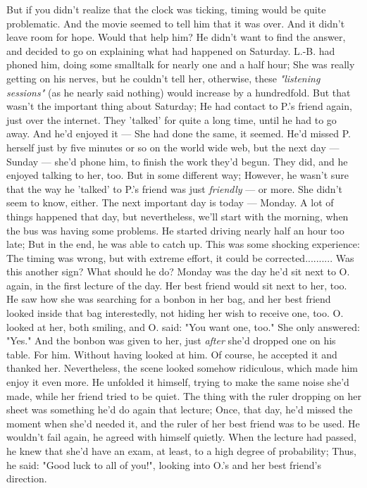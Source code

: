 But if you didn't realize that the clock was ticking, timing would be quite problematic. And the movie seemed to tell him that it was over. 
And it didn't leave room for hope. 
Would that help him?
He didn't want to find the answer, and decided to go on explaining what had happened on Saturday. L.-B. had phoned him, doing some smalltalk for nearly one and a half hour; She was really getting on his nerves, but he couldn't tell her, otherwise, these \emph{"listening sessions"} (as he nearly said nothing) would increase by a hundredfold. 
But that wasn't the important thing about Saturday; He had contact to P.'s friend again, just over the internet. They 'talked' for quite a long time, until he had to go away. And he'd enjoyed it --- She had done the same, it seemed. 
He'd missed P. herself just by five minutes or so on the world wide web, but the next day --- Sunday --- she'd phone him, to finish the work they'd begun. 
They did, and he enjoyed talking to her, too. But in some different way; However, he wasn't sure that the way he 'talked' to P.'s friend was just \emph{friendly} --- or more. She didn't seem to know, either. 
The next important day is today --- Monday. 
A lot of things happened that day, but nevertheless, we'll start with the morning, when the bus was having some problems. 
He started driving nearly half an hour too late; But in the end, he was able to catch up. This was some shocking experience: The timing was wrong, but with extreme effort, it could be corrected..........
Was this another sign? What should he do?
Monday was the day he'd sit next to O. again, in the first lecture of the day. Her best friend would sit next to her, too. He saw how she was searching for a bonbon in her bag, and her best friend looked inside that bag interestedly, not hiding her wish to receive one, too. O. looked at her, both smiling, and O. said: "You want one, too."
She only answered: "Yes."
And the bonbon was given to her, just \emph{after} she'd dropped one on his table. 
For him. 
Without having looked at him. 
Of course, he accepted it and thanked her. Nevertheless, the scene looked somehow ridiculous, which made him enjoy it even more. 
He unfolded it himself, trying to make the same noise she'd made, while her friend tried to be quiet. 
The thing with the ruler dropping on her sheet was something he'd do again that lecture; Once, that day, he'd missed the moment when she'd needed it, and the ruler of her best friend was to be used. 
He wouldn't fail again, he agreed with himself quietly. 
When the lecture had passed, he knew that she'd have an exam, at least, to a high degree of probability; Thus, he said: "Good luck to all of you!", looking into O.'s and her best friend's direction. 

